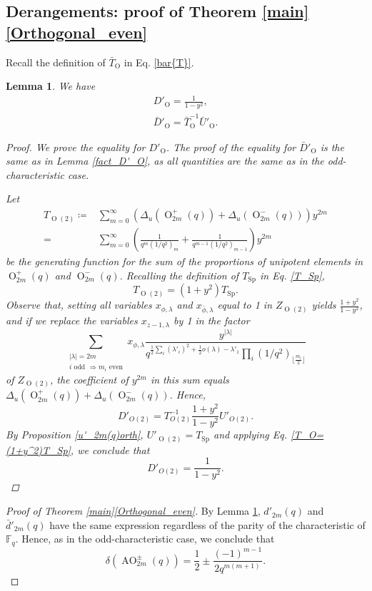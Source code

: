 \documentclass[a4paper, 12pt, oneside]{amsart}
\newtheorem{lemma}[prop]{Lemma}
\theoremstyle{definition}
\DeclareMathOperator{\AO}{AO}
\DeclareMathOperator{\Sp}{Sp}
\DeclareMathOperator{\Or}{O}
\begin{document}
\subsection{Derangements: proof of Theorem \ref{main}\eqref{Orthogonal_even} }
Recall the definition of $\bar{T}_{\Or}$ in Eq. \eqref{bar{T}}.
\begin{lemma}
We have
\label{fact_D'_Oeven}
\begin{align*}
D'_{\Or}=\frac{1}{1-y^2}, \\
\bar{D}'_{\Or}=\bar{T}_{\Or}^{-1}\bar{U}'_{\Or}.
\end{align*}
\begin{proof}
We prove the equality for $D'_{\Or}$. The proof of the equality for $\bar{D}'_{\Or}$ is the same as in Lemma \ref{fact_D'_O}, as all quantities are the same as in the odd-characteristic case.

Let \begin{align*}
T_{\Or(2)}\coloneqq& \sum_{m=0}^{\infty}\left(\Delta_u(\Or^{+}_{2m}(q))+\Delta_u(\Or^{-}_{2m}(q))\right)y^{2m}\\=&\sum_{m=0}^{\infty}\left(\frac{1}{q^m(1/q^2)_m}+\frac{1}{q^{m-1}(1/q^2)_{m-1}}\right)y^{2m} 
\end{align*}
be the generating function for the sum of the proportions of unipotent elements in $\Or^{+}_{2m}(q)$ and $\Or^{-}_{2m}(q)$. Recalling the definition of $T_{\Sp}$ in Eq. \eqref{T_Sp},
\begin{equation}
\label{T_O=(1+y^2)T_Sp}
T_{\Or(2)}=(1+y^2)T_{\Sp}.
\end{equation}
Observe that, setting all variables $x_{\phi, \lambda}$ and $x_{\bar{\phi}, \lambda}$ equal to 1 in $Z_{\Or(2)}$ yields $\frac{1+y^2}{1-y^2}$, and
if we replace the variables $x_{z-1,\lambda}$ by 1 in the factor
$$\sum_{\substack{|\lambda|=2m\\ i \text{ odd }\Rightarrow m_i \text{ even}}}x_{\phi,\lambda}\frac{y^{|\lambda|}}{q^{\frac{1}{2}\sum_i(\lambda'_i)^2+\frac{1}{2}o(\lambda)-\lambda'_1}\prod_i(1/q^2)_{\lfloor \frac{m_i}{2} \rfloor}}$$
of $Z_{\Or(2)}$, the coefficient of $y^{2m}$ in this sum equals $\Delta_u(\Or^{+}_{2m}(q))+\Delta_u(\Or^{-}_{2m}(q))$. Hence,
$$D'_{O(2)}=T^{-1}_{O(2)}\frac{1+y^2}{1-y^2}U'_{O(2)}.$$
By Proposition \ref{u'_2m(q)orth}, $U'_{\Or(2)}=T_{\Sp}$ and applying Eq. \eqref{T_O=(1+y^2)T_Sp}, we conclude that
$$D'_{O(2)}=\frac{1}{1-y^2}.$$
\end{proof}
\end{lemma}
\begin{proof}[Proof of Theorem \ref{main}\eqref{Orthogonal_even}]
By Lemma \ref{fact_D'_Oeven}, $d'_{2m}(q)$ and $\bar{d}'_{2m}(q)$ have the same expression regardless of the parity of the characteristic of $\mathbb{F}_q$. Hence, as in the odd-characteristic case, we conclude that
$$\delta(\AO^{\pm}_{2m}(q))=\frac{1}{2} \pm \frac{(-1)^{m-1}}{2q^{m(m+1)}}.$$
\end{proof}




\end{document}

